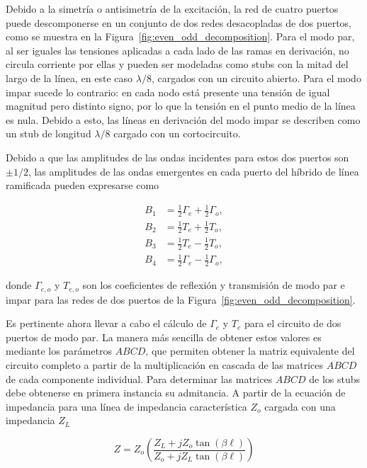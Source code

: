 Debido a la simetría o antisimetría de la excitación, la red de cuatro puertos puede descomponerse en un conjunto de dos redes desacopladas de dos puertos, como se muestra en la Figura~\ref{fig:even_odd_decomposition}. Para el modo par, al ser iguales las tensiones aplicadas a cada lado de las ramas en derivación, no circula corriente por ellas y pueden ser modeladas como stubs con la mitad del largo de la línea, en este caso $\lambda/8$, cargados con un circuito abierto. Para el modo impar sucede lo contrario: en cada nodo está presente una tensión de igual magnitud pero distinto signo, por lo que la tensión en el punto medio de la línea es nula. Debido a esto, las líneas en derivación del modo impar se describen como un stub de longitud $\lambda/8$ cargado con un cortocircuito.

Debido a que las amplitudes de las ondas incidentes para estos dos puertos son $\pm 1/2$, las amplitudes de las ondas emergentes en cada puerto del híbrido de línea ramificada pueden expresarse como

\begin{subequations}
    \begin{align}
        B_1 &= \frac{1}{2}\Gamma_e + \frac{1}{2}\Gamma_o, \\
        B_2 &= \frac{1}{2}T_e + \frac{1}{2}T_o,           \\
        B_3 &= \frac{1}{2}T_e - \frac{1}{2}T_o,           \\
        B_4 &= \frac{1}{2}\Gamma_e - \frac{1}{2}\Gamma_o,
    \end{align}
    \label{eq:scattered_waves}
\end{subequations}

donde $\Gamma_{e,o}$ y $T_{e,o}$ son los coeficientes de reflexión y transmisión de modo par e impar para las redes de dos puertos de la Figura~\ref{fig:even_odd_decomposition}. 

Es pertinente ahora llevar a cabo el cálculo de $\Gamma_e$ y $T_e$ para el circuito de dos puertos de modo par. La manera más sencilla de obtener estos valores es mediante los parámetros $ABCD$, que permiten obtener la matriz equivalente del circuito completo a partir de la multiplicación en cascada de las matrices $ABCD$ de cada componente individual. Para determinar las matrices $ABCD$ de los stubs debe obtenerse en primera instancia su admitancia. A partir de la ecuación de impedancia para una línea de impedancia característica $Z_o$ cargada con una impedancia $Z_L$

\begin{equation}
    Z = Z_o \left(\frac{Z_L + jZ_o\tan(\beta\ell)}{Z_o + jZ_L\tan(\beta\ell)}\right)
    \label{eq:stub_z}
\end{equation}

